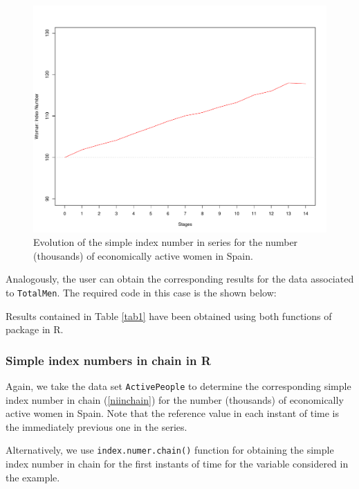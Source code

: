 \begin{figure}[h!]
	\centering
	\includegraphics[scale=0.4]{inseriewoman_new.pdf}
	\caption{Evolution of the simple index number in series for the number (thousands)  of economically active women in Spain.}
	\label{women_in_serie}
\end{figure}





Analogously, the user can obtain the corresponding results for the data associated to \verb|TotalMen|. The required code in this case is the shown below:

Results contained in Table \ref{tab1} have been obtained using both functions of  package in R.

\subsubsection{Simple index numbers in chain in R}

Again, we take the data set \verb|ActivePeople| to determine the corresponding simple index number in chain (\ref{niinchain}) for the number (thousands) of economically active women in Spain. Note that the reference value in each instant of time is the immediately previous one in the series. 

Alternatively, we use \verb|index.numer.chain()| function for obtaining the simple index number in chain for the first instants of time for the variable considered in the example. 

